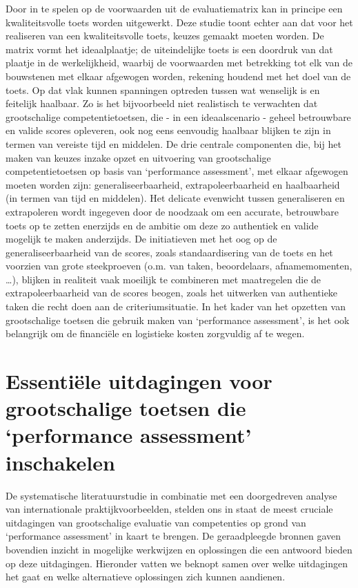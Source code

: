 \documentclass[
  letterpaper,
]{report}
\begin{document}
Door in te spelen op de voorwaarden uit de evaluatiematrix kan in
principe een kwaliteitsvolle toets worden uitgewerkt. Deze studie toont
echter aan dat voor het realiseren van een kwaliteitsvolle toets, keuzes
gemaakt moeten worden. De matrix vormt het ideaalplaatje; de
uiteindelijke toets is een doordruk van dat plaatje in de werkelijkheid,
waarbij de voorwaarden met betrekking tot elk van de bouwstenen met
elkaar afgewogen worden, rekening houdend met het doel van de toets. Op
dat vlak kunnen spanningen optreden tussen wat wenselijk is en feitelijk
haalbaar. Zo is het bijvoorbeeld niet realistisch te verwachten dat
grootschalige competentietoetsen, die - in een ideaalscenario - geheel
betrouwbare en valide scores opleveren, ook nog eens eenvoudig haalbaar
blijken te zijn in termen van vereiste tijd en middelen. De drie
centrale componenten die, bij het maken van keuzes inzake opzet en
uitvoering van grootschalige competentietoetsen op basis van
`performance assessment', met elkaar afgewogen moeten worden zijn:
generaliseerbaarheid, extrapoleerbaarheid en haalbaarheid (in termen van
tijd en middelen). Het delicate evenwicht tussen generaliseren en
extrapoleren wordt ingegeven door de noodzaak om een accurate,
betrouwbare toets op te zetten enerzijds en de ambitie om deze zo
authentiek en valide mogelijk te maken anderzijds. De initiatieven met
het oog op de generaliseerbaarheid van de scores, zoals standaardisering
van de toets en het voorzien van grote steekproeven (o.m. van taken,
beoordelaars, afnamemomenten, \ldots), blijken in realiteit vaak
moeilijk te combineren met maatregelen die de extrapoleerbaarheid van de
scores beogen, zoals het uitwerken van authentieke taken die recht doen
aan de criteriumsituatie. In het kader van het opzetten van
grootschalige toetsen die gebruik maken van `performance assessment', is
het ook belangrijk om de financiële en logistieke kosten zorgvuldig af
te wegen.

\hypertarget{essentiuxeble-uitdagingen-voor-grootschalige-toetsen-die-performance-assessment-inschakelen}{%
\chapter{Essentiële uitdagingen voor grootschalige toetsen die
`performance assessment'
inschakelen}\label{essentiuxeble-uitdagingen-voor-grootschalige-toetsen-die-performance-assessment-inschakelen}}

De systematische literatuurstudie in combinatie met een doorgedreven
analyse van internationale praktijkvoorbeelden, stelden ons in staat de
meest cruciale uitdagingen van grootschalige evaluatie van competenties
op grond van `performance assessment' in kaart te brengen. De
geraadpleegde bronnen gaven bovendien inzicht in mogelijke werkwijzen en
oplossingen die een antwoord bieden op deze uitdagingen. Hieronder
vatten we beknopt samen over welke uitdagingen het gaat en welke
alternatieve oplossingen zich kunnen aandienen.
\end{document}
